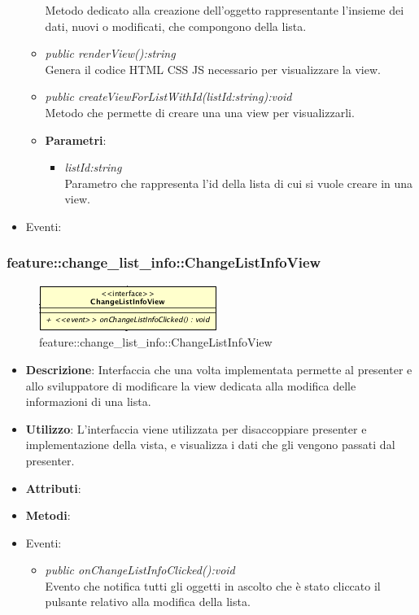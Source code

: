 \begin{itemize}
\begin{itemize}
	 	Metodo dedicato alla creazione dell'oggetto rappresentante l'insieme dei dati, nuovi o modificati, che compongono della lista.
	\item \textit{public renderView():string}\\
	Genera il codice HTML CSS JS necessario per visualizzare la view.
	\item \textit{public createViewForListWithId(listId:string):void}\\
		Metodo che permette di creare una una view per visualizzarli.
			\item{\textbf{Parametri}: \begin{itemize}
			\item \textit{listId:string}\\
			Parametro che rappresenta l'id della lista di cui si vuole creare in una view.
			\end{itemize}}
	\end{itemize}
\item{Eventi}:
\end{itemize}

\subsubsection{feature::change\_list\_info::ChangeListInfoView}

\label{feature::change\_list\_info::ChangeListInfoView}
\begin{figure}[ht]
	\centering
	\includegraphics[scale=0.5]{Sezioni/SottosezioniST/img/app/ChangeListInfoView.png}
	\caption{feature::change\_list\_info::ChangeListInfoView}
\end{figure}

\begin{itemize}
\item \textbf{Descrizione}: Interfaccia che una volta implementata permette al presenter e allo sviluppatore di modificare la view dedicata alla modifica delle informazioni di una lista.
\item \textbf{Utilizzo}: L'interfaccia viene utilizzata per disaccoppiare presenter e implementazione della vista, e visualizza i dati che gli vengono passati dal presenter.
\item \textbf{Attributi}: 
\item \textbf{Metodi}:
\item{Eventi}:
	\begin{itemize}	
	\item \textit{public onChangeListInfoClicked():void}\\
		Evento che notifica tutti gli oggetti in ascolto che è stato cliccato il pulsante relativo alla modifica della lista.
	\end{itemize}
\end{itemize}

